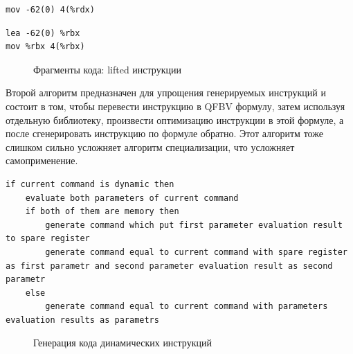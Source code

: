 \newsavebox\boxfive
\begin{lrbox}{\boxfive}
\begin{lstlisting}[xleftmargin = 20pt]
mov -62(0) 4(%rdx)
\end{lstlisting}
\end{lrbox}

\newsavebox\boxsix
\begin{lrbox}{\boxsix}
\begin{lstlisting}[xleftmargin = 20pt]
lea -62(0) %rbx 
mov %rbx 4(%rbx)
\end{lstlisting}
\end{lrbox}

\begin{figure}[!t]
\subfloat[\label{fig:qfbv1}]{\usebox\boxfour}
\hfill
\subfloat[\label{fig:qfbv22}]{\usebox\boxfive}
\hfill
\subfloat[\label{fig:qfbv3}]{\usebox\boxsix}
\caption{Фрагменты кода: lifted инструкции}
\end{figure}

Второй алгоритм предназначен для упрощения генерируемых инструкций и состоит в том, чтобы перевести инструкцию в QFBV формулу, затем используя отдельную библиотеку, произвести оптимизацию инструкции в этой формуле, а после сгенерировать инструкцию по формуле обратно. Этот алгоритм тоже слишком сильно усложняет алгоритм специализации, что усложняет самоприменение.

\newsavebox\boxminustwo
\begin{lrbox}{\boxminustwo}
\begin{lstlisting}[xleftmargin = 20pt]
if current command is dynamic then
    evaluate both parameters of current command
    if both of them are memory then
        generate command which put first parameter evaluation result to spare register
        generate command equal to current command with spare register as first parametr and second parameter evaluation result as second parametr
    else 
        generate command equal to current command with parameters evaluation results as parametrs
\end{lstlisting}
\end{lrbox}
\begin{figure}[!t]
\centering
\subfloat{\usebox\boxminustwo}
\caption{Генерация кода динамических инструкций\label{fig:generate}}
\end{figure}

